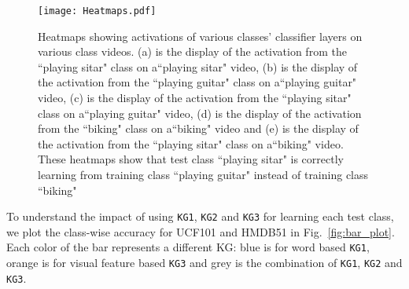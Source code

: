 \begin{table*}
\centering
\caption{Results on UCF101 with 10 randomly selected test classes leaving 91 classes to be used for training I3D and GCN. Mean accuracy is used for evaluation. The experiments are carried out 5 times and the final column provides the mean accuracy scores. We compare our results to two previous work with similar settings.}
\label{table:results1}
\end{table*}

\begin{figure}
\begin{center}
\texttt{[image: Heatmaps.pdf]}
\end{center}
\caption{Heatmaps showing activations of various classes' classifier layers on various class videos. (a) is the display of the activation from the ``playing sitar" class on a``playing sitar" video, (b) is the display of the activation from the ``playing guitar" class on a``playing guitar" video, (c) is the display of the activation from the ``playing sitar" class on a``playing guitar" video, (d) is the display of the activation from the ``biking" class on a``biking" video and (e) is the display of the activation from the ``playing sitar" class on a``biking" video. These heatmaps show that test class ``playing sitar" is correctly learning from training class ``playing guitar" instead of training class ``biking"}
\label{fig:heatmaps}
\end{figure}

To understand the impact of using \texttt{KG1}, \texttt{KG2} and \texttt{KG3} for learning each test class, we plot the class-wise accuracy for UCF101 and HMDB51 in Fig.~\ref{fig:bar_plot}. Each color of the bar represents a different KG: blue is for word based \texttt{KG1}, orange is for visual feature based \texttt{KG3} and grey is the combination of \texttt{KG1}, \texttt{KG2} and \texttt{KG3}.

